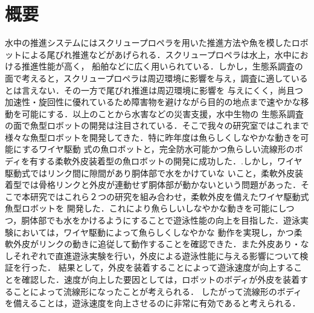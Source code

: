\newpage
\section*{概要}
水中の推進システムにはスクリュープロペラを用いた推進方法や魚を模したロボットによる尾びれ推進などがあげられる．スクリュープロペラは水上，水中における推進性能が高く，
船舶などに広く用いられている．しかし，生態系調査の面で考えると，スクリュープロペラは周辺環境に影響を与え，調査に適しているとは言えない．その一方で尾びれ推進は周辺環境に影響を
与えにくく，尚且つ加速性・旋回性に優れているため障害物を避けながら目的の地点まで速やかな移動を可能にする．以上のことから水害などの災害支援，水中生物の
生態系調査の面で魚型ロボットの開発は注目されている．そこで我々の研究室ではこれまで様々な魚型ロボットを開発してきた．特に昨年度は魚らしくしなやかな動きを可能にするワイヤ駆動
式の魚ロボットと，完全防水可能かつ魚らしい流線形のボディを有する柔軟外皮装着型の魚ロボットの開発に成功した．.しかし，ワイヤ駆動式ではリンク間に隙間があり胴体部で水をかけていな
いこと，柔軟外皮装着型では骨格リンクと外皮が連動せず胴体部が動かないという問題があった．そこで本研究ではこれら２つの研究を組み合わせ，柔軟外皮を備えたワイヤ駆動式魚型ロボットを
開発した．これにより魚らしいしなやかな動きを可能にしつつ，胴体部でも水をかけるようにすることで遊泳性能の向上を目指した．遊泳実験においては，ワイヤ駆動によって魚らしくしなやかな
動作を実現し，かつ柔軟外皮がリンクの動きに追従して動作することを確認できた．また外皮あり・なしそれぞれで直進遊泳実験を行い，外皮による遊泳性能に与える影響について検証を行った．
結果として，外皮を装着することによって遊泳速度が向上することを確認した．速度が向上した要因としては，ロボットのボディが外皮を装着することによって流線形になったことが考えられる．
したがって流線形のボディを備えることは，遊泳速度を向上させるのに非常に有効であると考えられる．

\newpage
